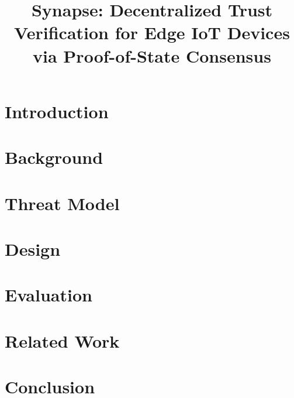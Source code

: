 \documentclass[conference]{IEEEtran}
\begin{document}
\title{Synapse: Decentralized Trust Verification for Edge IoT Devices via Proof-of-State Consensus}

\author{
}

\maketitle

\begin{abstract}

\end{abstract}

\section{Introduction}
\label{sec:intro}


\section{Background}
\label{sec:background}


\section{Threat Model}
\label{sec:threat_model}


\section{Design}
\label{sec:design}


\section{Evaluation}
\label{sec:evaluation}


\section{Related Work}
\label{sec:related_work}


\section{Conclusion}
\label{sec:conclusion}




\end{document}
